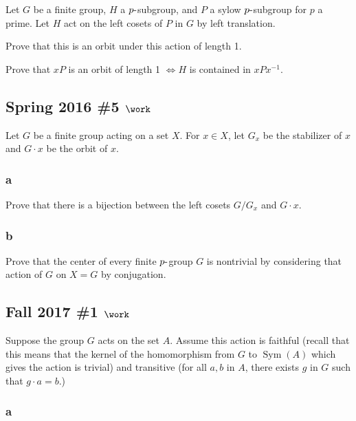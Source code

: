 Let \(G\) be a finite group, \(H\) a \(p{\hbox{-}}\)subgroup, and \(P\)
a sylow \(p{\hbox{-}}\)subgroup for \(p\) a prime. Let \(H\) act on the
left cosets of \(P\) in \(G\) by left translation.

Prove that this is an orbit under this action of length 1.

Prove that \(xP\) is an orbit of length 1 \(\iff H\) is contained in
\(xPx^{-1}\).

\hypertarget{spring-2016-5-work}{%
\subsection{\texorpdfstring{Spring 2016 \#5
\(\work\)}{Spring 2016 \#5 \textbackslash work}}\label{spring-2016-5-work}}

Let \(G\) be a finite group acting on a set \(X\). For \(x\in X\), let
\(G_x\) be the stabilizer of \(x\) and \(G\cdot x\) be the orbit of
\(x\).

\hypertarget{a-15}{%
\subsubsection{a}\label{a-15}}

Prove that there is a bijection between the left cosets \(G/G_x\) and
\(G\cdot x\).

\hypertarget{b-15}{%
\subsubsection{b}\label{b-15}}

Prove that the center of every finite \(p{\hbox{-}}\)group \(G\) is
nontrivial by considering that action of \(G\) on \(X=G\) by
conjugation.

\hypertarget{fall-2017-1-work}{%
\subsection{\texorpdfstring{Fall 2017 \#1
\(\work\)}{Fall 2017 \#1 \textbackslash work}}\label{fall-2017-1-work}}

Suppose the group \(G\) acts on the set \(A\). Assume this action is
faithful (recall that this means that the kernel of the homomorphism
from \(G\) to \(\operatorname{Sym}(A)\) which gives the action is
trivial) and transitive (for all \(a, b\) in \(A\), there exists \(g\)
in \(G\) such that \(g \cdot a = b\).)

\hypertarget{a-16}{%
\subsubsection{a}\label{a-16}}

